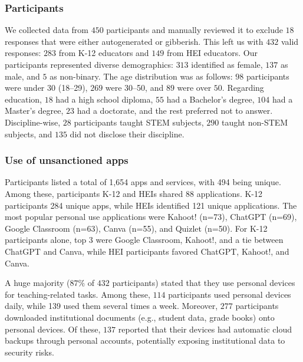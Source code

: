 \subsubsection{Participants}
We collected data from $450$ participants and manually reviewed it to exclude $18$ responses that were either autogenerated or gibberish. This left us with $432$ valid responses: $283$ from K-12 educators and $149$ from HEI educators.
Our participants represented diverse demographics: $313$ identified as female, $137$ as male, and $5$ as non-binary. 
The age distribution was as follows: $98$ participants were under $30$ (18–29), $269$ were 30–50, and $89$ were over $50$.
Regarding education, $18$ had a high school diploma, $55$ had a Bachelor’s degree, $104$ had a Master’s degree, $23$ had a doctorate, and the rest preferred not to answer.
Discipline-wise, $28$ participants taught STEM subjects, $290$ taught non-STEM subjects, and $135$ did not disclose their discipline.

\subsubsection{Use of unsanctioned apps}
\label{use_unsanctioned_apps}
Participants listed a total of 1,654 apps and services, with 494 being unique. Among these, participants K-12 and HEIs shared 88 applications. K-12 participants 284 unique apps, while HEIs identified 121 unique applications.
The most popular personal use applications were Kahoot! (n=73), ChatGPT (n=69), Google Classroom (n=63), Canva (n=55), and Quizlet (n=50). For K-12 participants alone, top 3 were Google Classroom, Kahoot!, and a tie between ChatGPT and Canva, while HEI participants favored ChatGPT, Kahoot!, and Canva.

A huge majority ($87\%$ of $432$ participants) stated that they use personal devices for teaching-related tasks.
Among these, $114$ participants used personal devices daily, while 139 used them several times a week.
Moreover, $277$ participants downloaded institutional documents (e.g., student data, grade books) onto personal devices.
Of these, $137$ reported that their devices had automatic cloud backups through personal accounts, potentially exposing institutional data to security risks. %

